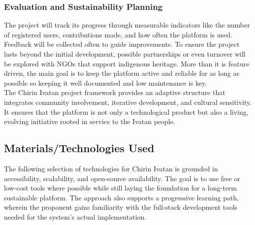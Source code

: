             \subsubsection{Evaluation and Sustainability Planning}
            The project will track its progress through measurable indicators like the number of registered users, contributions made, and how often the platform is used. Feedback will be collected often to guide improvements. To ensure the project lasts beyond the initial development, possible partnerships or even turnover will be explored with NGOs that support indigenous heritage. More than it is feature driven, the main goal is to keep the platform active and reliable for as long as possible so keeping it well documented and low maintenance is key. \\
            
            The Chirin Ivatan project framework provides an adaptive structure that integrates community involvement, iterative development, and cultural sensitivity. It ensures that the platform is not only a technological product but also a living, evolving initiative rooted in service to the Ivatan people.


            
        \subsection{Materials/Technologies Used}
        The following selection of technologies for Chirin Ivatan is grounded in accessibility, scalability, and open-source availability. The goal is to use free or low-cost tools where possible while still laying the foundation for a long-term sustainable platform. The approach also supports a progressive learning path, wherein the proponent gains familiarity with the full-stack development tools needed for the system’s actual implementation.

